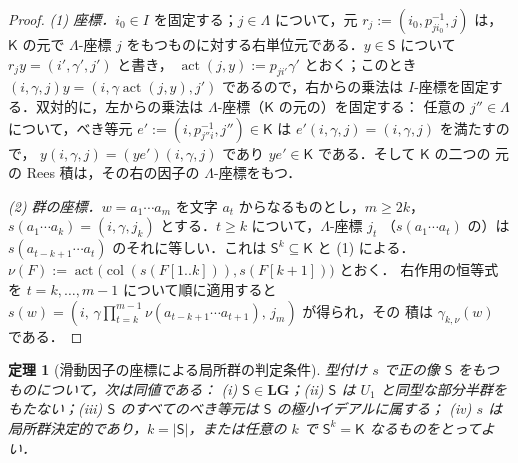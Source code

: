 \documentclass[11pt,a4paper]{ltjsarticle}
\numberwithin{equation}{section}
\theoremstyle{plain}
\newtheorem{theorem}{定理}[section]
\theoremstyle{definition}
\theoremstyle{remark}
\theoremstyle{plain}
\begin{document}
\begin{proof}
\emph{(1) 座標．}$i_0\in I$ を固定する；$j\in\Lambda$ について，元
$r_j:=(i_0,p_{ji_0}^{-1},j)$ は，
$\mathsf K$ の元で $\Lambda$-座標 $j$ をもつものに対する右単位元である．$y\in \mathsf S$ について $r_jy=(i',\gamma',j')$ と書き，
$\operatorname{act}(j,y):=p_{ji'}\gamma'$ とおく；このとき
$(i,\gamma,j)y=(i,\gamma\operatorname{act}(j,y),j')$ であるので，右からの乗法は
$I$-座標を固定する．双対的に，左からの乗法は $\Lambda$-座標（$\mathsf K$ の元の）を固定する：
任意の $j''\in\Lambda$ について，べき等元
$e':=(i,p_{j''i}^{-1},j'')\in\mathsf K$ は $e'(i,\gamma,j)=(i,\gamma,j)$ を満たすので，
$y(i,\gamma,j)=(ye')(i,\gamma,j)$ であり $ye'\in\mathsf K$ である．そして $\mathsf K$ の二つの
元の Rees 積は，その右の因子の $\Lambda$-座標をもつ．

\emph{(2) 群の座標．}$w=a_1\cdots a_m$ を文字 $a_t$ からなるものとし，$m\ge2k$，
$s(a_1\cdots a_k)=(i,\gamma,j_k)$ とする．$t\ge k$ について，$\Lambda$-座標 $j_t$
（$s(a_1\cdots a_t)$ の）は $s(a_{t-k+1}\cdots a_t)$ のそれに等しい．これは $\mathsf S^k\subseteq\mathsf K$
と (1) による．
$\nu(F):=\operatorname{act}\bigl(\operatorname{col}(s(F[1..k])),s(F[k+1])\bigr)$ とおく．
右作用の恒等式を $t=k,\ldots,m-1$ について順に適用すると
$s(w)=(i,\,\gamma\prod_{t=k}^{m-1}\nu(a_{t-k+1}\cdots a_{t+1}),\,j_m)$ が得られ，その
積は $\gamma_{k,\nu}(w)$ である．
\end{proof}

\begin{theorem}[滑動因子の座標による局所群の判定条件]
\label{thm:lg-characterization}
型付け $s$ で正の像 $\mathsf S$ をもつものについて，次は同値である：
\textup{(i)} $\mathsf S\in\mathbf{LG}$；\textup{(ii)} $\mathsf S$ は
$U_1$ と同型な部分半群をもたない；\textup{(iii)} $\mathsf S$ のすべてのべき等元は $\mathsf S$ の極小イデアルに属する；
\textup{(iv)} $s$ は局所群決定的であり，$k=|\mathsf S|$，または任意の $k$ で $\mathsf S^k=\mathsf K$ なるものをとってよい．
\end{theorem}
\end{document}
